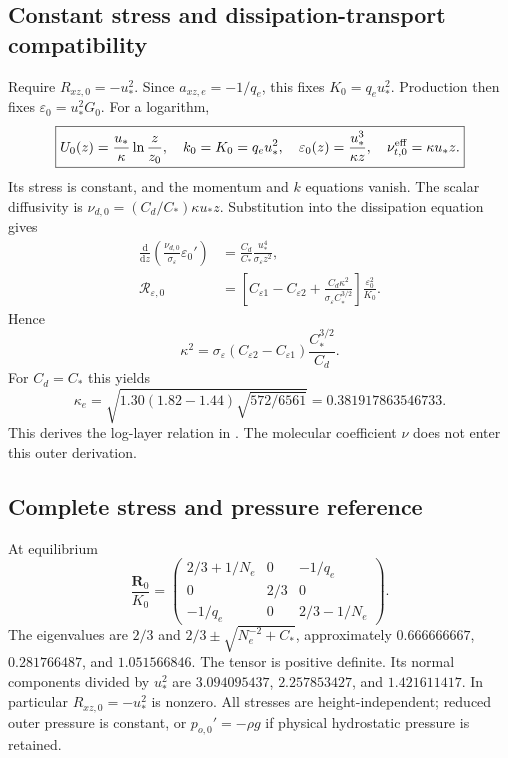 \documentclass[11pt,a4paper]{article}
\numberwithin{equation}{section}
\newcommand{\dd}{\mathrm d}
\newcommand{\eps}{\varepsilon}
\begin{document}
\subsection{Constant stress and dissipation-transport compatibility}
Require $R_{xz,0}=-u_*^2$. Since $a_{xz,e}=-1/q_e$, this fixes
$K_0=q_eu_*^2$. Production then fixes
$\eps_0=u_*^2G_0$. For a logarithm,
\begin{equation}
 \boxed{
 U_0(z)=\frac{u_*}{\kappa}\ln\frac z{z_0},\quad
 k_0=K_0=q_eu_*^2,\quad
 \eps_0(z)=\frac{u_*^3}{\kappa z},\quad
 \nu_{t,0}^{\rm eff}=\kappa u_*z.}
 \label{eq:outer-reference-family}
\end{equation}
Its stress is constant, and the momentum and $k$ equations vanish.
The scalar diffusivity is
$\nu_{d,0}=(C_d/C_*)\kappa u_*z$. Substitution into the
dissipation equation gives
\begin{align}
 \frac{\dd}{\dd z}
 \left(\frac{\nu_{d,0}}{\sigma_\eps}\eps_0'\right)
 &=\frac{C_d}{C_*}\frac{u_*^4}{\sigma_\eps z^2},\nonumber\\
 \mathcal R_{\eps,0}
 &=\left[C_{\eps1}-C_{\eps2}
 +\frac{C_d\kappa^2}{\sigma_\eps C_*^{3/2}}\right]\frac{\eps_0^2}{K_0}.
 \label{eq:epsilon-reference-residual}
\end{align}
Hence
\begin{equation}
 \boxed{\kappa^2
 =\sigma_\eps(C_{\eps2}-C_{\eps1})\frac{C_*^{3/2}}{C_d}.}
 \label{eq:kappa-compatibility}
\end{equation}
For $C_d=C_*$ this yields
\begin{equation}
 \boxed{\kappa_e
 =\sqrt{1.30(1.82-1.44)\sqrt{572/6561}}
 =0.381917863546733.}
 \label{eq:kappa-default}
\end{equation}
This derives the log-layer relation in
\cite[Equations (22)--(23)]{Baungaard2022}.
The molecular coefficient $\nu$ does not enter this outer derivation.

\subsection{Complete stress and pressure reference}
At equilibrium
\begin{equation}
 \frac{\bm R_0}{K_0}=
 \begin{pmatrix}
 2/3+1/N_e&0&-1/q_e\\
 0&2/3&0\\
 -1/q_e&0&2/3-1/N_e
 \end{pmatrix}.
 \label{eq:outer-covariance}
\end{equation}
The eigenvalues are
$2/3$ and $2/3\pm\sqrt{N_e^{-2}+C_*}$,
approximately $0.666666667$, $0.281766487$, and $1.051566846$.
The tensor is positive definite. Its normal components divided by
$u_*^2$ are $3.094095437$, $2.257853427$, and $1.421611417$.
In particular $R_{xz,0}=-u_*^2$ is nonzero.
All stresses are height-independent; reduced outer pressure is constant,
or $p_{o,0}'=-\rho g$ if physical hydrostatic pressure is retained.
\end{document}
